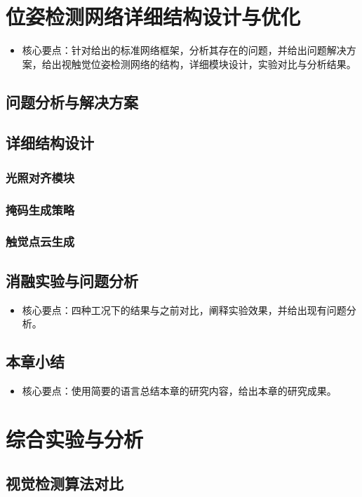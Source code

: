 \documentclass{Diploma}
\begin{document}
\chapter{位姿检测网络详细结构设计与优化}
\begin{itemize}
  \item 核心要点：针对给出的标准网络框架，分析其存在的问题，并给出问题解决方案，给出视触觉位姿检测网络的结构，详细模块设计，实验对比与分析结果。
\end{itemize}
\section{问题分析与解决方案}
\section{详细结构设计}
\subsection{光照对齐模块}
\subsection{掩码生成策略}
\subsection{触觉点云生成}
\section{消融实验与问题分析}
\begin{itemize}
  \item 核心要点：四种工况下的结果与之前对比，阐释实验效果，并给出现有问题分析。
\end{itemize}
\section{本章小结}
\begin{itemize}
  \item 核心要点：使用简要的语言总结本章的研究内容，给出本章的研究成果。
\end{itemize}
\chapter{综合实验与分析}
\section{视觉检测算法对比}
\end{document}
